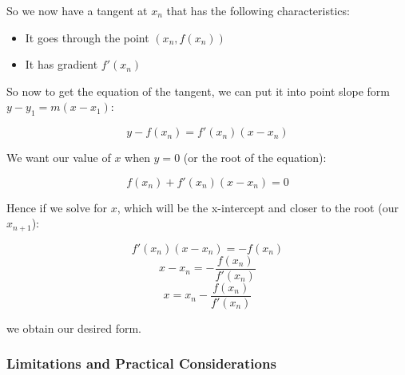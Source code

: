 \documentclass[
]{article}
\begin{document}
So we now have a tangent at \(x_n\) that has the following
characteristics:

\begin{itemize}
\item
  It goes through the point \((x_n, f(x_n))\)
\item
  It has gradient \(f'(x_n)\)
\end{itemize}

So now to get the equation of the tangent, we can put it into point
slope form \(y-y_1=m(x-x_1)\):

\[y-f(x_n)=f'(x_n)(x-x_n)\]

We want our value of \(x\) when \(y=0\) (or the root of the equation):

\[f(x_n)+f'(x_n)(x-x_n)=0\]

Hence if we solve for \(x\), which will be the x-intercept and closer to
the root (our \(x_{n+1}\)):

\[f'(x_n)(x-x_n)=-f(x_n)\]
\[x-x_n=-\frac{f(x_n)}{f'(x_n)}\]
\[x=x_n-\frac{f(x_n)}{f'(x_n)}\]

we obtain our desired form.

\hypertarget{header-n38}{%
\subsubsection{Limitations and Practical
Considerations}\label{header-n38}}
\end{document}
